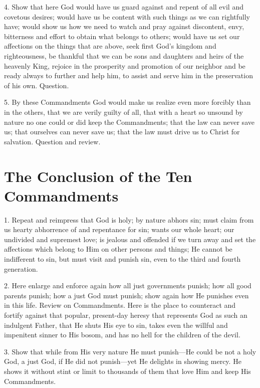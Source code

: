  4. Show that here God would have us guard against and repent of all evil and covetous desires; would have us be content with such things as we can rightfully have; would show us how we need to watch and pray against discontent, envy, bitterness and effort to obtain what belongs to others; would have us set our affections on the things that are above, seek first God’s kingdom and righteousness, be thankful that we can be sons and daughters and heirs of the heavenly King, rejoice in the prosperity and promotion of our neighbor and be ready always to further and help him, to assist and serve him in the preservation of his own. Question.

5. By these Commandments God would make us realize even more forcibly than in the others, that we are verily guilty of all, that with a heart so unsound by nature no one could or did keep the Commandments; that the law can never save us; that ourselves can never save us; that the law must drive us to Christ for salvation. Question and review.

\section[The Conclusion]{The Conclusion of the Ten Commandments}

 1. Repeat and reimpress that God is holy; by nature abhors sin; must claim from us hearty abhorrence of and repentance for sin; wants our whole heart; our undivided and supremest love; is jealous and offended if we turn away and set the affections which belong to Him on other persons and
things; He cannot be indifferent to sin, but must visit and punish sin, even to the third and fourth generation.

2. Here enlarge and enforce again how all just governments punish; how all good parents punish; how a just God must punish; show again how He punishes even in this life. Review on Commandments. Here is the place to counteract and fortify against that popular, present-day heresy that represents God as such an indulgent Father, that He shuts His eye to sin, takes even the willful and impenitent sinner to His bosom, and has no hell for the children of the devil.

 3. Show that while from His very nature He must punish—He could be not a holy God, a just God, if He did not punish—yet He delights in showing mercy. He shows it without stint or limit to thousands of them that love Him and keep His Commandments.

